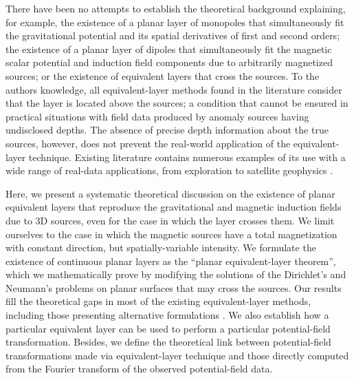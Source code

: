 There have been no attempts to establish the theoretical background explaining, for example,
the existence of a planar layer of monopoles that simultaneously fit the gravitational  
potential and its spatial derivatives of first and second orders; 
the existence of a planar layer of dipoles that simultaneously fit the magnetic scalar 
potential and induction field components due to arbitrarily magnetized sources; or the 
existence of equivalent layers that cross the sources.
To the authors knowledge, all equivalent-layer methods found in the literature 
consider that the layer is located above the sources; 
a condition that cannot be ensured in practical situations with field data produced by 
anomaly sources having undisclosed depths.
The absence of precise depth information about the true sources, however, 
does not prevent the real-world application of the equivalent-layer technique.
Existing literature contains numerous examples of its use with a wide range of real-data 
applications, from exploration to satellite geophysics \citep[e.g.,][]{gonzalez_etal2022}.

Here, we present a systematic theoretical 
discussion on the existence of planar equivalent layers 
that reproduce the gravitational and magnetic induction fields due to 3D sources, 
even for the case in which the layer crosses them.
We limit ourselves to the case in which the magnetic
sources have a total magnetization with constant direction, but spatially-variable intensity.
We formulate the existence of continuous planar layers as the 
``planar equivalent-layer theorem'', which we mathematically prove by modifying the 
solutions of the Dirichlet's and Neumann's problems 
on planar surfaces that may cross the sources. 
Our results fill the theoretical gaps in most of the existing equivalent-layer methods, 
including those presenting alternative formulations 
\citep[e.g.,][]{cordell1992, guspi_novara2009}.
We also establish how a particular equivalent layer can be used to perform a particular 
potential-field transformation.
Besides, we define the theoretical link between potential-field transformations made via 
equivalent-layer technique and those directly computed from the Fourier transform of the 
observed potential-field data. 

